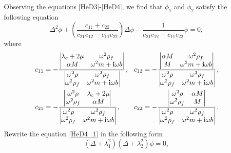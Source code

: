 \documentclass[11pt]{article}
\newcommand{\la}{\lambda}
\begin{document}
Observing the equations \eqref{HeD3}-\eqref{HeD4}, we find that $\phi_1$ and $\phi_2$ satisfy the following equation
\begin{equation}\label{HeD4_1}
\Delta^2 \phi +\left(\frac{c_{11}+c_{22}}{c_{21}c_{12}-c_{11}c_{22}}\right) \Delta \phi
-\frac{1}{c_{21}c_{12}-c_{11}c_{22} }\phi=0,
\end{equation}
where
\begin{equation*}
\begin{aligned}
c_{11}& =-\frac{\begin{vmatrix}
\la_c+2\mu&	\omega^2\rho_f\\
\alpha M 	&\omega^2m+{\bf{i}}\omega b
\end{vmatrix}}{\begin{vmatrix}
\omega^2\rho&	\omega^2\rho_f\\
\omega^2\rho_f	&\omega^2m+{\bf{i}}\omega b
\end{vmatrix}},
& c_{12} &=-\frac{\begin{vmatrix}
\alpha M &	\omega^2\rho_f\\
M 	&\omega^2m+{\bf{i}}\omega b
\end{vmatrix}}{\begin{vmatrix}
\omega^2\rho&	\omega^2\rho_f\\
\omega^2\rho_f	&\omega^2m+{\bf{i}}\omega b
\end{vmatrix}},\\
c_{21}& =-\frac{\begin{vmatrix}
\omega^2\rho&	\la_c+2\mu\\
\omega^2\rho_f	&\alpha M 
\end{vmatrix}}{\begin{vmatrix}
\omega^2\rho&	\omega^2\rho_f\\
\omega^2\rho_f	&\omega^2m+{\bf{i}}\omega b
\end{vmatrix}},
& c_{22} &=-\frac{\begin{vmatrix}
\omega^2\rho&	\alpha M\\
\omega^2\rho_f	&	M 
\end{vmatrix}}{\begin{vmatrix}
\omega^2\rho&	\omega^2\rho_f\\
\omega^2\rho_f	&\omega^2m+{\bf{i}}\omega b
\end{vmatrix}}.
\end{aligned}
\end{equation*}
Rewrite the equation \eqref{HeD4_1} in the following form
\begin{equation}\label{HeD5}
(\Delta+\la_1^2) (\Delta+\la_2^2)\phi=0,
\end{equation}
\end{document}

